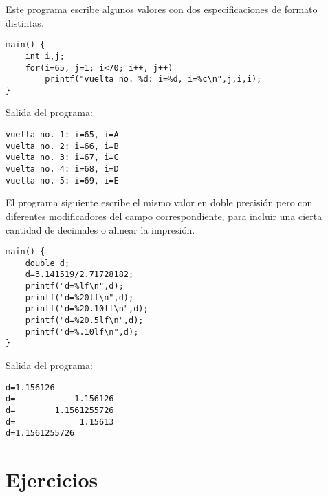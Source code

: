 \begin{ejemplo}
Este programa escribe algunos valores con dos especificaciones de formato distintas.

\begin{lstlisting}
main() {
	int i,j;
	for(i=65, j=1; i<70; i++, j++)
		printf("vuelta no. %d: i=%d, i=%c\n",j,i,i);
}
\end{lstlisting}
Salida del programa:
\begin{lstlisting}
vuelta no. 1: i=65, i=A
vuelta no. 2: i=66, i=B
vuelta no. 3: i=67, i=C
vuelta no. 4: i=68, i=D
vuelta no. 5: i=69, i=E
\end{lstlisting}
\end{ejemplo}
\begin{ejemplo}
El programa siguiente escribe el mismo valor en doble precisión pero con diferentes
modificadores del campo correspondiente, para incluir una cierta cantidad de decimales o alinear la impresión. 
\begin{lstlisting}
main() {
	double d;
	d=3.141519/2.71728182;
	printf("d=%lf\n",d);
	printf("d=%20lf\n",d);
	printf("d=%20.10lf\n",d);
	printf("d=%20.5lf\n",d);
	printf("d=%.10lf\n",d);
}	
\end{lstlisting}
Salida del programa:
\begin{lstlisting}
d=1.156126
d=            1.156126
d=        1.1561255726
d=             1.15613
d=1.1561255726
\end{lstlisting}
\end{ejemplo}

\section{Ejercicios}

